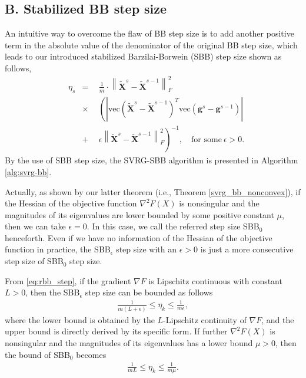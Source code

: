 \documentclass[letterpaper]{article} %
\begin{document}
\subsection{B. Stabilized BB step size}

An intuitive way to overcome the flaw of BB step size is to add another positive term in the absolute value of the denominator of the original BB step size, which leads to our introduced stabilized Barzilai-Borwein (SBB) step size shown as follows,
\begin{equation}
	\label{eq:rbb_step}
	\begin{aligned}
		& \eta_{s} &=&\ \ \frac{1}{m}\cdot\left\|\tilde{\mathbf{X}}^{s}-\tilde{\mathbf{X}}^{s-1}\right\|^2_F\\
		& &\times& \ \ \left(\left|\text{vec}(\tilde{\mathbf{X}}^{s}-\tilde{\mathbf{X}}^{s-1})^T\text{vec}(\mathbf{g}^s-\mathbf{g}^{s-1})\right|\right.\\
		& &+&\ \ \left.\epsilon\left\|\tilde{\mathbf{X}}^{s}-\tilde{\mathbf{X}}^{s-1}\right\|^2_F\right)^{-1}, \quad \text{for some} \  \epsilon>0.
	\end{aligned}
\end{equation}
By the use of SBB step size, the SVRG-SBB algorithm is presented in Algorithm \ref{alg:svrg-bb}.

Actually, as shown by our latter theorem (i.e., Theorem \ref{svrg_bb_nonconvex}), if the Hessian of the objective function $\nabla^2 F(X)$ is nonsingular and the magnitudes of its eigenvalues are lower bounded by some positive constant $\mu$, then we can take $\epsilon=0$. In this case, we call the referred step size SBB$_0$ henceforth. Even if we have no information of the Hessian of the objective function in practice, the SBB$_\epsilon$ step size with an $\epsilon>0$ is just a more consecutive step size of SBB$_0$ step size.



From \eqref{eq:rbb_step}, if the gradient $\nabla F$ is Lipschitz continuous with constant $L>0$, then the SBB$_\epsilon$ step size can be bounded as follows
\begin{align}
\label{eq:bound-rbb}
\frac{1}{m(L+\epsilon)} \leq \eta_k \leq \frac{1}{m\epsilon},
\end{align}
where the lower bound is obtained by the $L$-Lipschitz continuity of $\nabla F$, and the upper bound is directly derived by its specific form.
If further $\nabla^2 F(X)$ is nonsingular and the magnitudes of its eigenvalues has a lower bound $\mu>0$,
then the bound of SBB$_0$ becomes
\begin{align}
\label{eq:bound-rbb0}
\frac{1}{m L} \leq \eta_k \leq \frac{1}{m \mu}.
\end{align}
\end{document}
